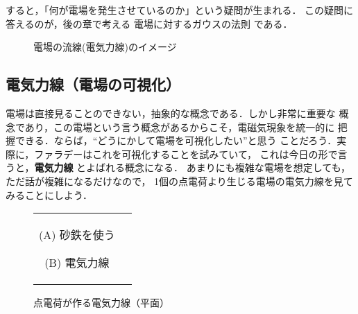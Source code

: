                すると，「何が電場を発生させているのか」という疑問が生まれる．
                この疑問に答えるのが，後の章で考える 電場に対するガウスの法則
                である．
                \begin{figure}[hbt]
                    \begin{center}
                        \caption{電場の流線(電気力線)のイメージ}
                        \label{fig:denba_image}
                    \end{center}
                \end{figure}


        \subsection{電気力線（電場の可視化）}\label{subsec:dennki_rikisenn}
            電場は直接見ることのできない，抽象的な概念である．しかし非常に重要な
            概念であり，この電場という言う概念があるからこそ，電磁気現象を統一的に
            把握できる．ならば，“どうにかして電場を可視化したい”と思う
            ことだろう．実際に，ファラデーはこれを可視化することを試みていて，
            これは今日の形で言うと，\textbf{電気力線} とよばれる概念になる．
            あまりにも複雑な電場を想定しても，ただ話が複雑になるだけなので，
            1個の点電荷より生じる電場の電気力線を見てみることにしよう．
            \begin{figure}[hbt]
                \begin{tabular}{cc}
                    \begin{minipage}{0.3\hsize}
                        \begin{center}
                            {denriki_gazoukensaku.pdf}

                            (A) 砂鉄を使う
                        \end{center}
                    \end{minipage}
                    \begin{minipage}{0.7\hsize}
                        \begin{center}
                            {denriki_gazoukensaku_2.pdf}

                            (B) 電気力線
                        \end{center}
                    \end{minipage}
                \end{tabular}
                \caption{点電荷が作る電気力線（平面）\label{fig:denriki1111}}
            \end{figure}


